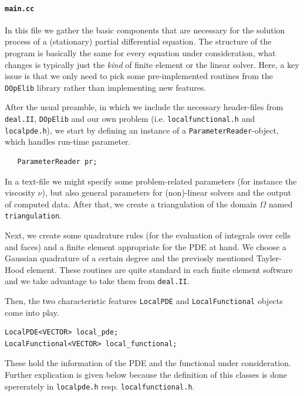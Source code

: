 \documentclass[prodmode,acmtoms]{acmsmall}
\numberwithin{equation}{section}
\newcommand{\deal}{\texttt{deal.II}}
\newcommand{\dope}{\texttt{DOpElib}}
\begin{document}
\paragraph{\texttt{main.cc}}
In this file we gather the basic components that are necessary for the
solution process of a (stationary) partial differential equation. The
structure of the program is basically the same for every equation under
consideration, what changes is typically just the \textit{kind} of  finite
element or the linear solver. Here, a key issue is that we only need to pick 
some pre-implemented routines from the \dope{} library rather than 
implementing new features.


After the usual preamble, in which we include the necessary header-files from \deal{}, \dope{} and our own problem (i.e. \texttt{localfunctional.h} and \texttt{localpde.h}), we start by defining an instance of a \texttt{ParameterReader}-object, which handles run-time parameter.
\begin{lstlisting}
   ParameterReader pr;
\end{lstlisting}
In a text-file we might specify some problem-related parameters (for instance the viscosity $\nu$), but also general parameters for (non)-linear solvers and the output of computed data. 
After that, we create a triangulation of the domain $\Omega$ named \texttt{triangulation}.

Next, we create some quadrature rules (for the evaluation of integrals over
cells and faces) and a finite element appropriate for the PDE at hand. We
choose a Gaussian quadrature of a certain degree and the previosly mentioned
Tayler-Hood element. These routines are quite standard in each finite element
software and we take advantage to take them from \deal{}.


Then, the two characteristic features \texttt{LocalPDE} and \texttt{LocalFunctional} objects come into play.
\begin{lstlisting}
LocalPDE<VECTOR> local_pde;
LocalFunctional<VECTOR> local_functional;
\end{lstlisting}
These hold the information of the PDE and the functional under consideration. Further explication is given below because
the definition of this classes is done spererately in \texttt{localpde.h} resp.   \texttt{localfunctional.h}.
\end{document}

